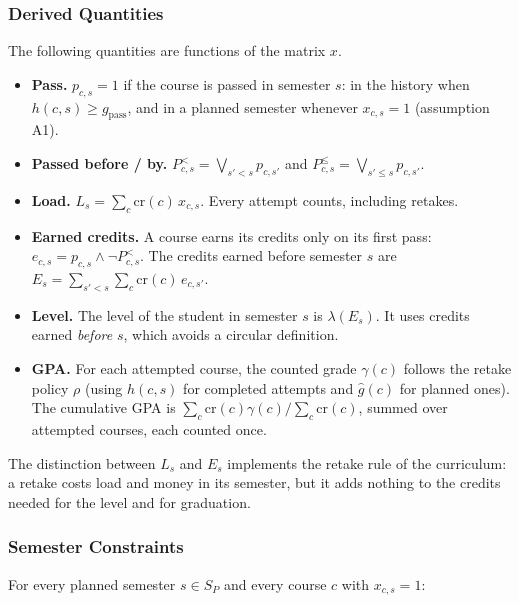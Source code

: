 \documentclass[10pt,a4paper]{article}
\begin{document}
      \subsubsection{Derived Quantities}

The following quantities are functions of the matrix $x$.

\begin{itemize}
  \item \textbf{Pass.} $p_{c,s}=1$ if the course is passed in semester $s$:
        in the history when $h(c,s) \ge g_{\mathrm{pass}}$, and in a planned
        semester whenever $x_{c,s}=1$ (assumption A1).
  \item \textbf{Passed before / by.} $P^{<}_{c,s}=\bigvee_{s'<s} p_{c,s'}$ and
        $P^{\le}_{c,s}=\bigvee_{s'\le s} p_{c,s'}$.
  \item \textbf{Load.} $L_s=\sum_{c} \mathrm{cr}(c)\,x_{c,s}$.
        Every attempt counts, including retakes.
  \item \textbf{Earned credits.} A course earns its credits only on its
        first pass: $e_{c,s}=p_{c,s}\wedge\neg P^{<}_{c,s}$.
        The credits earned before semester $s$ are
        $E_s=\sum_{s'<s}\sum_c \mathrm{cr}(c)\,e_{c,s'}$.
  \item \textbf{Level.} The level of the student in semester $s$ is
        $\lambda(E_s)$. It uses credits earned \emph{before} $s$, which avoids
        a circular definition.
  \item \textbf{GPA.} For each attempted course, the counted grade
        $\gamma(c)$ follows the retake policy $\rho$ (using $h(c,s)$ for
        completed attempts and $\hat g(c)$ for planned ones). The cumulative GPA is
        $\sum_c \mathrm{cr}(c)\gamma(c)\big/\sum_c \mathrm{cr}(c)$, summed over attempted
        courses, each counted once.
\end{itemize}

The distinction between $L_s$ and $E_s$ implements the retake rule of the
curriculum: a retake costs load and money in its semester, but it adds
nothing to the credits needed for the level and for graduation.

      \subsubsection{Semester Constraints}

For every planned semester $s \in S_P$ and every course $c$ with $x_{c,s}=1$:
\end{document}
